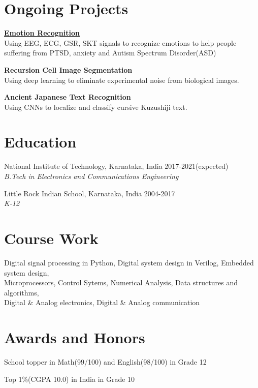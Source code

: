 \documentclass[letterpaper]{article}
\renewenvironment{itemize}{
  \begin{list}{}{
    \setlength{\leftmargin}{1.5em}
  }
}{
  \end{list}
}
\begin{document}
\section*{Ongoing Projects}
  \begin{itemize}
    \item
    \href{https://github.com/rshwndsz/emotion-recognition}{\textbf{Emotion Recognition}}\\
    Using EEG, ECG, GSR, SKT signals to recognize emotions to help people suffering from PTSD, anxiety and Autism Spectrum Disorder(ASD)
    \item
    \textbf{Recursion Cell Image Segmentation}\\
    Using deep learning to eliminate experimental noise from biological images.
    \item
    \textbf{Ancient Japanese Text Recognition}\\
    Using CNNs to localize and classify cursive Kuzushiji text.
  \end{itemize}

\section*{Education}
  \begin{itemize}
    \item National Institute of Technology, Karnataka, India\hfill 
    2017-2021(expected)
    \\
    {\sl B.Tech in Electronics and Communications Engineering}

    \item Little Rock Indian School, Karnataka, India\hfill
    2004-2017
    \\
    {\sl K-12}\hfill
  \end{itemize}

\section*{Course Work}
  Digital signal processing in Python, Digital system design in Verilog, Embedded system design, \\
  Microprocessors, Control Sytems, Numerical Analysis, Data structures and algorithms, \\
  Digital \& Analog electronics, Digital \& Analog communication

\section*{Awards and Honors}
\begin{itemize}
  \item School topper in Math(99/100) and English(98/100) in Grade 12
  \item Top 1\%(CGPA 10.0) in India in Grade 10
\end{itemize}
\end{document}
